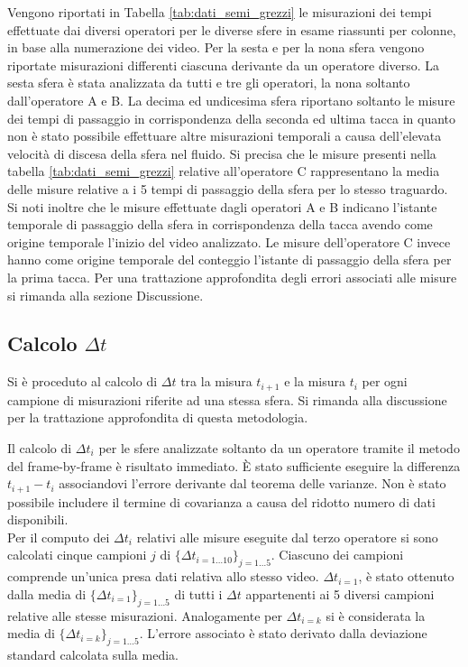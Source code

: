 \documentclass[a4paper,11pt,oneside]{article}
\begin{document}
Vengono riportati in Tabella \ref{tab:dati_semi_grezzi} le misurazioni dei tempi effettuate dai diversi operatori per le diverse sfere in esame riassunti per colonne, in base alla numerazione dei video.
Per la sesta e per la nona sfera vengono riportate misurazioni differenti ciascuna derivante da un operatore diverso. La sesta sfera è stata analizzata da tutti e tre gli operatori, la nona soltanto dall'operatore A e B.
La decima ed undicesima sfera riportano soltanto le misure dei tempi di passaggio in corrispondenza della seconda ed ultima tacca in quanto non è stato possibile effettuare altre misurazioni temporali a causa dell'elevata velocità di discesa della sfera nel fluido.
Si precisa che le misure presenti nella tabella \ref{tab:dati_semi_grezzi} relative all'operatore C rappresentano la media delle misure relative a i 5 tempi di passaggio della sfera per lo stesso traguardo.
Si noti inoltre che le misure effettuate dagli operatori A e B indicano l'istante temporale di passaggio della sfera in corrispondenza della tacca avendo come origine temporale l'inizio del video analizzato. Le misure dell'operatore C invece hanno come origine temporale  del conteggio l'istante di passaggio della sfera per la prima tacca.
Per una trattazione approfondita degli errori associati alle misure si rimanda alla sezione Discussione.\\




\subsection{Calcolo $\Delta t$}
Si è proceduto al calcolo di $\Delta t$ tra la misura $t_{i+1}$ e la misura $t_{i}$ per ogni campione di misurazioni riferite ad una stessa sfera. Si rimanda alla discussione per la trattazione approfondita di questa metodologia.

Il calcolo di $\Delta t_{i}$ per le sfere analizzate soltanto da un operatore tramite il metodo del frame-by-frame è risultato immediato. È stato sufficiente eseguire la differenza $t_{i+1}- t_{i}$ associandovi l'errore derivante dal teorema delle varianze. Non è stato possibile includere il termine di covarianza a causa del ridotto numero di dati disponibili.\\
\newline
Per il computo dei $\Delta t_{i}$ relativi alle misure eseguite dal terzo operatore si sono calcolati cinque campioni $j$ di $\{\Delta t_{i=1\dots10}\}_{j=1\dots5}$. Ciascuno dei campioni comprende un'unica presa dati relativa allo stesso video.
$\Delta t_{i=1}$, è stato ottenuto dalla media di $\{\Delta t_{i=1}\}_{j=1\dots5}$ di tutti i $\Delta t$ appartenenti ai 5 diversi campioni relative alle stesse misurazioni. Analogamente per $\Delta t_{i=k}$ si è considerata la media di $\{{\Delta t_{i=k}}\}_{j=1\dots5}$. L'errore associato è stato derivato dalla deviazione standard calcolata sulla media.
\end{document}
